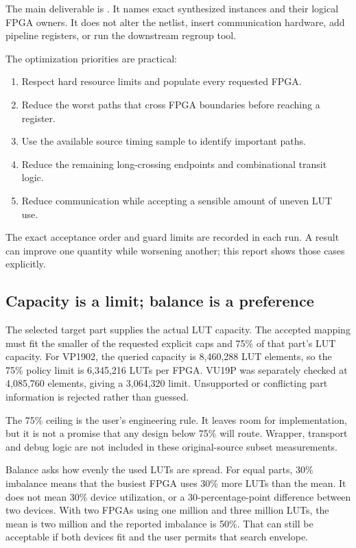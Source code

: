 \documentclass[11pt]{article}
\newcommand{\code}[1]{\texttt{\detokenize{#1}}}
\begin{document}
The main deliverable is \code{mapping.txt}. It names exact synthesized instances and their logical FPGA owners. It does not alter the netlist, insert communication hardware, add pipeline registers, or run the downstream regroup tool.

The optimization priorities are practical:
\begin{enumerate}
\item Respect hard resource limits and populate every requested FPGA.
\item Reduce the worst paths that cross FPGA boundaries before reaching a register.
\item Use the available source timing sample to identify important paths.
\item Reduce the remaining long-crossing endpoints and combinational transit logic.
\item Reduce communication while accepting a sensible amount of uneven LUT use.
\end{enumerate}
The exact acceptance order and guard limits are recorded in each run. A result can improve one quantity while worsening another; this report shows those cases explicitly.

\subsection{Capacity is a limit; balance is a preference}

The selected target part supplies the actual LUT capacity. The accepted mapping must fit the smaller of the requested explicit caps and 75\% of that part's LUT capacity. For VP1902, the queried capacity is 8,460,288 LUT elements, so the 75\% policy limit is 6,345,216 LUTs per FPGA. VU19P was separately checked at 4,085,760 elements, giving a 3,064,320 limit. Unsupported or conflicting part information is rejected rather than guessed.

The 75\% ceiling is the user's engineering rule. It leaves room for implementation, but it is not a promise that any design below 75\% will route. Wrapper, transport and debug logic are not included in these original-source subset measurements.

Balance asks how evenly the used LUTs are spread. For equal parts, 30\% imbalance means that the busiest FPGA uses 30\% more LUTs than the mean. It does not mean 30\% device utilization, or a 30-percentage-point difference between two devices. With two FPGAs using one million and three million LUTs, the mean is two million and the reported imbalance is 50\%. That can still be acceptable if both devices fit and the user permits that search envelope.
\end{document}
